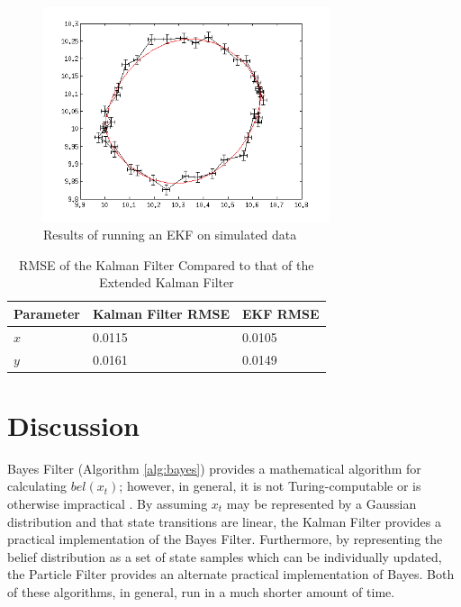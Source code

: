 \documentclass[english]{article}
\begin{document}
\begin{figure}[htp]
\label{fig:rekf}
\centering
 \includegraphics[width=0.75\textwidth]{images/ExtendedKalman.png}
\caption{Results of running an EKF on simulated data}
\end{figure}

\begin{table}[htp]
\label{tbl:rkalman}
\begin{center}
\begin{tabular}{|l|l|l|}
\hline
\textbf{Parameter} & \textbf{Kalman Filter RMSE} & \textbf{EKF RMSE} \\
\hline
$x$ & 0.0115 & 0.0105 \\
$y$ & 0.0161 & 0.0149 \\
\hline
\end{tabular}
\end{center}
\caption{RMSE of the Kalman Filter Compared to that of the Extended Kalman Filter}
\end{table}


\section{Discussion}

Bayes Filter (Algorithm \ref{alg:bayes}) provides a mathematical algorithm for calculating $bel(x_t)$; however, in general, it is not Turing-computable or is otherwise impractical \cite{probrob}. By assuming $x_t$ may be represented by a Gaussian distribution and that state transitions are linear, the Kalman Filter provides a practical implementation of the Bayes Filter. Furthermore, by representing the belief distribution as a set of state samples which can be individually updated, the Particle Filter provides an alternate practical implementation of Bayes. Both of these algorithms, in general, run in a much shorter amount of time.
\end{document}
